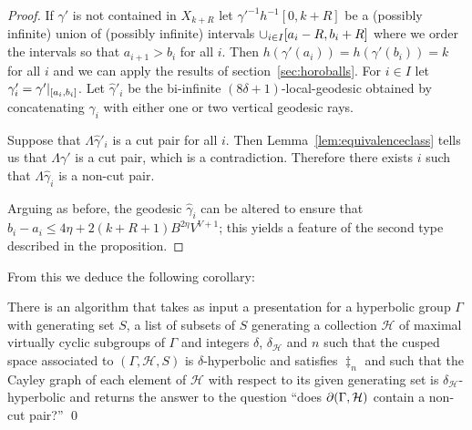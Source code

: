 \begin{proof}
If $\gamma'$ is not contained in $X_{k+R}$ let $\gamma'^{-1}h^{-1}[0, k+R]$ be
a (possibly infinite) union of (possibly infinite) intervals $\cup_{i \in
I}[a_i-R, b_i+R]$ where we order the intervals so that $a_{i+1} > b_i$ for all
$i$. Then $h(\gamma'(a_i)) = h(\gamma'(b_i)) = k$ for all $i$ and we can apply
the results of section~\ref{sec:horoballs}.  For $i \in I$ let $\gamma'_i =
\gamma'\vert_{[a_i, b_i]}$. Let $\hat{\gamma}'_i$ be the bi-infinite
$(8\delta + 1)$-local-geodesic obtained by concatenating $\gamma_i$ with
either one or two vertical geodesic rays.

Suppose that $\Lambda\hat\gamma'_i$ is a cut pair for all $i$. Then
Lemma~\ref{lem:equivalenceclass} tells us that $\Lambda\gamma'$ is a cut pair,
which is a contradiction.  Therefore there exists $i$ such that
$\Lambda\hat\gamma_i$ is a non-cut pair. 

Arguing as before, the geodesic $\hat\gamma_i$ can be altered to ensure that
$b_i - a_i \leq 4\eta + 2(k+R+1)B^{2\eta}V^{V+1}$; this yields a feature of the
second type described in the proposition.  \end{proof}

From this we deduce the following corollary:

\begin{cor}\label{cor:noncutpaircomputable} There is an algorithm that takes as
input a presentation for a hyperbolic group $\Gamma$ with generating set $S$,
a list of subsets of $S$ generating a collection $\mathcal{H}$ of maximal virtually cyclic
subgroups of $\Gamma$ and integers $\delta$, $\delta_\mathcal{H}$ and $n$ such that the
cusped space associated to $(\Gamma, \mathcal{H}, S)$ is $\delta$-hyperbolic
and satisfies $\ddag_n$ and such that the Cayley graph of each element of
$\mathcal{H}$ with respect to its given generating set is
$\delta_\mathcal{H}$-hyperbolic and returns the answer to the question ``does
$\partial(\Gamma, \mathcal{H})$ contain a non-cut pair?'' \qed \end{cor}


